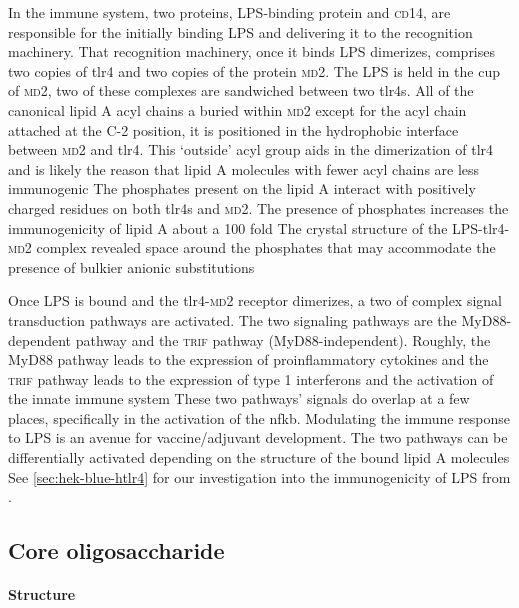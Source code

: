 In the immune system, two proteins, \ac{LPS}-binding protein and \textsc{cd}14, are responsible for the initially binding \ac{LPS} and delivering it to the recognition machinery.
That recognition machinery, once it binds \ac{LPS} dimerizes, comprises two copies of \ac{tlr4} and two copies of the protein \textsc{md}2. The \ac{LPS} is held in the cup of
\textsc{md}2, two of these complexes are sandwiched between two \acp{tlr4}. All of the canonical lipid A acyl chains a buried within \textsc{md}2 except for the acyl chain attached
at the C-2 position, it is positioned in the hydrophobic interface between \textsc{md}2 and \ac{tlr4}. This `outside' acyl group aids in the dimerization of \ac{tlr4} and is likely
the reason that lipid A molecules with fewer acyl chains are less immunogenic The phosphates present on the lipid A interact with positively
charged residues on both \acp{tlr4} and \textsc{md}2. The presence of phosphates increases the immunogenicity of lipid A about a 100 fold The
crystal structure of the \ac{LPS}-\ac{tlr4}-\textsc{md}2 complex revealed space around the phosphates that may accommodate the presence of bulkier anionic
substitutions

Once \ac{LPS} is bound and the \ac{tlr4}-\textsc{md}2 receptor dimerizes, a two of complex signal transduction pathways are activated. The two signaling pathways are the
MyD88-dependent pathway and the \textsc{trif} pathway (MyD88-independent). Roughly, the MyD88 pathway leads to the expression of proinflammatory cytokines and the \textsc{trif}
pathway leads to the expression of type 1 interferons and the activation of the innate immune system These two pathways' signals do overlap at a few places,
specifically in the activation of the \ac{nfkb}. Modulating the immune response to \ac{LPS} is an avenue for vaccine/adjuvant development. The two pathways can be differentially
activated depending on the structure of the bound lipid A molecules See \cref{sec:hek-blue-htlr4} for our investigation into the immunogenicity of
\ac{LPS} from \caulobacter.

  \subsection{Core oligosaccharide}\label{sec:core-oligosaccharide-intro}
  
    \paragraph{Structure}

